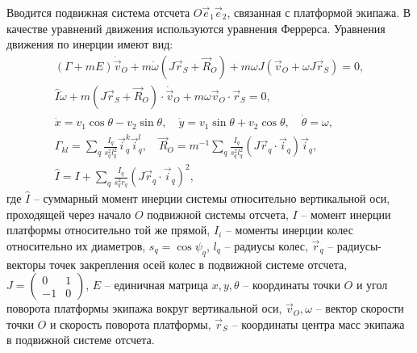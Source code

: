 Вводится подвижная система отсчета $O\vec{e}_1\vec{e}_2$, связанная с платформой экипажа. В качестве уравнений движения используются уравнения Феррерса. Уравнения движения по инерции имеют вид:
\begin{eqnarray}\label{eq:bor}
    (\Gamma+mE)\dot{\vec{v}}_O + m\dot{\omega}(J\vec{r}_S+\vec{R}_O)+m\omega J(\vec{v}_O + \omega J\vec{r}_S) = 0,\\
    \hat{I}\dot{\omega} + m(J\vec{r}_S+\vec{R}_O)\cdot\dot{\vec{v}}_O+m\omega\vec{v}_O\cdot\vec{r}_S = 0,\\
    \dot{x} = v_1\cos\theta - v_2\sin\theta, \quad \dot{y} = v_1\sin\theta + v_2\cos\theta, \quad \dot{\theta} = \omega,\\
    \Gamma_{kl} = \sum_q \frac{I_q}{s_q^2 l_q^2}\vec{i}_q^k\vec{i}_q^l, \quad \vec{R}_O = m^{-1}\sum_q \frac{I_q}{s_q^2 l_q^2}(J\vec{r}_q\cdot \vec{i}_q) \vec{i}_q,\\
    \hat{I} = I + \sum_q \frac{I_q}{s_q^2 r_q}(J\vec{r}_q\cdot \vec{i}_q)^2,
\end{eqnarray}
где $\hat{I}$ -- суммарный момент инерции системы относительно вертикальной оси, проходящей через начало $O$ подвижной системы отсчета,\newline
$I$ -- момент инерции платформы относительно той же прямой,\newline
$I_i$ -- моменты инерции колес относительно их диаметров,\newline
$s_q = \cos\psi_q$, \quad $l_q$ -- радиусы колес,\newline
$\vec{r}_q$ -- радиусы-векторы точек закрепления осей колес в подвижной системе отсчета,\newline
$J = \left(\begin{array}{cc}0 & 1\\-1 & 0\end{array}\right)$,
\quad $E$ -- единичная матрица\newline
$x,y,\theta$ -- координаты точки $O$ и угол поворота платформы экипажа вокруг вертикальной оси,\newline
$\vec{v}_O, \omega$ -- вектор скорости точки $O$ и скорость поворота платформы,\newline
$\vec{r}_S$ -- координаты центра масс экипажа в подвижной системе отсчета.


